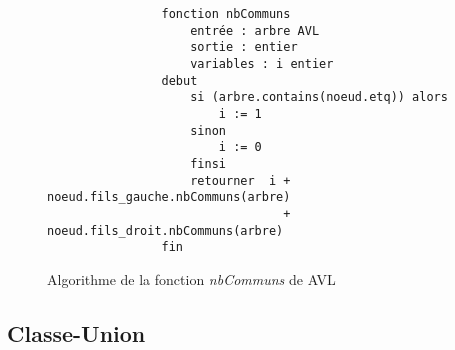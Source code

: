 \documentclass[a4paper]{article}
\begin{document}
\begin{itemize}
			\begin{figure}
	    	    \begin{verbatim}
	    	    fonction nbCommuns
	    	        entrée : arbre AVL
	    	        sortie : entier
	    	        variables : i entier
	    	    debut
	    	        si (arbre.contains(noeud.etq)) alors
	    	            i := 1
	    	        sinon
	    	            i := 0
	    	        finsi
	    	        retourner  i + noeud.fils_gauche.nbCommuns(arbre) 
	    	                     + noeud.fils_droit.nbCommuns(arbre)
	    	    fin
	    	    \end{verbatim}
	    	    \caption{Algorithme de la fonction \textit{nbCommuns} de AVL \label{algo_nbCommuns} }
	    	 \end{figure}
	    	 
		\end{itemize}
		
		\subsection{Classe-Union}
\end{document}
